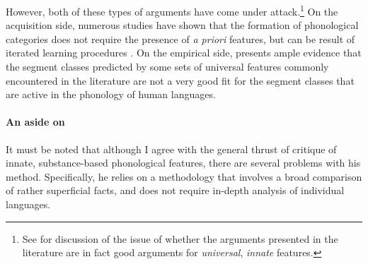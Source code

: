 However, both of these types of arguments have come under attack.\footnote{See \citet{mielke-diss,samuels11:_phonol} for discussion of the issue of whether the arguments presented in the literature are in fact good arguments for \emph{universal}, \emph{innate} features.} On the acquisition side, numerous studies have shown that the formation of phonological categories does not require the presence of \emph{a priori} features, but can be result of iterated learning procedures \citep{boersma98:_funct,boersma03:_learn,boersma08,escudero03:_model_optim_theor_gradual_learn_algor,boer00:_self,boer01,oudeyer05}. On the empirical side, \citet{mielke-diss} presents ample evidence that the segment classes predicted by some sets of universal features commonly encountered in the literature are not a very good fit for the segment classes that are active in the phonology of human languages.

\paragraph{An aside on \citet{mielke-diss}}
\label{sec:an-aside-citetmielke}

It must be noted that although I agree with the general thrust of  critique of innate, substance\hyp based phonological features, there are several problems with his method. Specifically, he relies on a methodology that involves a broad comparison of rather superficial facts, and does not require in\hyp depth analysis of individual languages.

